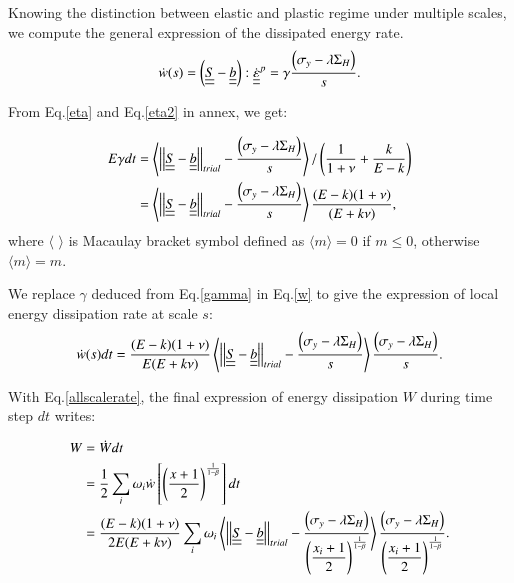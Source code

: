 \documentclass[3p,times,number,review]{elsarticle}
\begin{document}
Knowing the distinction between elastic and plastic regime under multiple scales, we compute the general expression of the dissipated energy rate.
\begin{equation}
\dot{w}(s)=\left( \uline{\uline{S}}-\uline{\uline{b}}\right) :\dot{\uline{\uline{\varepsilon}}}^p=\gamma\dfrac{  \left(\sigma_y-\lambda \Sigma_H\right)}{s}.
\label{w}
\end{equation}

From Eq.\eqref{eta} and Eq.\eqref{eta2} in annex, we get:

\begin{equation}
	\begin{split}
		E\gamma dt&=\left\langle \left| \left|\uline{\uline{S}}-\uline{\uline{b}}\right| \right|_{trial}-\dfrac{ \left(\sigma_y-\lambda \Sigma_H\right)}{s}\right\rangle /\left(\dfrac{1}{1+\nu}+\dfrac{k}{E-k} \right)
		\\&=\left\langle \left| \left|\uline{\uline{S}}-\uline{\uline{b}}\right| \right|_{trial}-\dfrac{ \left(\sigma_y-\lambda \Sigma_H\right)}{s}\right\rangle\dfrac{(E-k)(1+\nu) }{(E+k\nu)},
	\end{split}
	\label{gamma}
\end{equation}
where $\langle$ $\rangle$ is Macaulay bracket symbol defined as $\langle m\rangle=0$ if $m\leqslant0$, otherwise $\langle m\rangle=m$.

We replace $\gamma$ deduced from Eq.\eqref{gamma} in Eq.\eqref{w} to give the expression of local energy dissipation rate at scale $s$:
\begin{equation}
\dot{w}(s)dt=\dfrac{(E-k)(1+\nu) }{E(E+k\nu)}\left\langle  \left| \left|\uline{\uline{S}}-\uline{\uline{b}}\right| \right|_{trial}-\dfrac{ \left(\sigma_y-\lambda \Sigma_H\right)}{s}\right\rangle \dfrac{ \left(\sigma_y-\lambda \Sigma_H\right)}{s}.
\label{dW}
\end{equation}

With Eq.\eqref{allscalerate}, the final expression of energy dissipation $W$ during time step $dt$ writes:

\begin{equation}
\begin{split}
W&=\dot{W}dt
\\&=\frac{1}{2}\sum_{i}\omega_i\dot{w}\left[  \left( \frac{x+1}{2}\right) ^{\frac{1}{1-\beta}}\right]dt
\\&=\dfrac{(E-k)(1+\nu) }{2E(E+k\nu)}\sum_{i}\omega_i\left\langle  \left| \left|\uline{\uline{S}}-\uline{\uline{b}}\right| \right|_{trial}-\dfrac{\left(\sigma_y-\lambda \Sigma_H\right) }{\left( \dfrac{x_i+1}{2}\right) ^{\frac{1}{1-\beta}}}\right\rangle \dfrac{\left(\sigma_y-\lambda \Sigma_H\right) }{\left( \dfrac{x_i+1}{2}\right)^{\frac{1}{1-\beta}}}.
\end{split}
\label{finaldw}
\end{equation}
\end{document}
